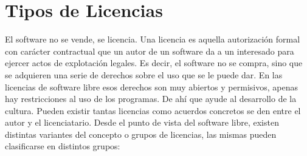 \documentclass{article}
\begin{document}
\section {Tipos de Licencias}
El software no se vende, se licencia. Una licencia es aquella autorización formal con carácter contractual que un autor de un software da a un interesado para ejercer actos de explotación legales. Es decir, el software no se compra, sino que se adquieren una serie de derechos sobre el uso que se le puede dar. En las licencias de software libre esos derechos son muy abiertos y permisivos, apenas hay restricciones al uso de los programas. De ahí que ayude al desarrollo de la cultura. Pueden existir tantas licencias como acuerdos concretos se den entre el autor y el licenciatario. Desde el punto de vista del software libre, existen distintas variantes del concepto o grupos de licencias, las mismas pueden clasificarse en distintos grupos:\\
\end{document}
